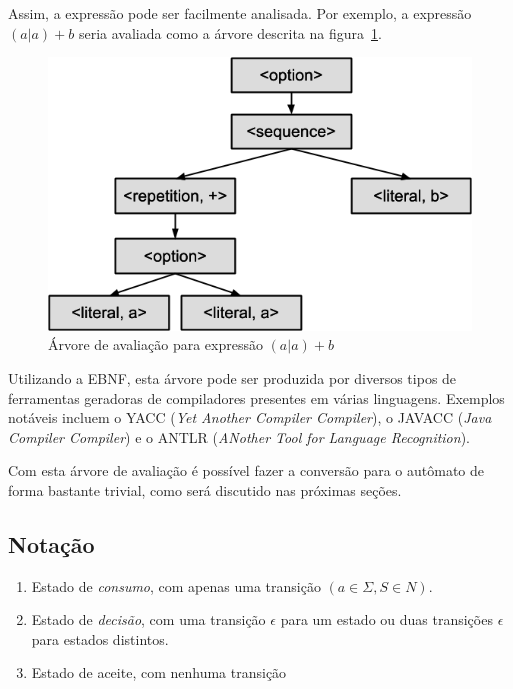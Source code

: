 \documentclass[a4paper,12pt,oneside,onecolumn]{uerj}
\begin{document}
Assim, a expressão pode ser facilmente analisada. Por exemplo, a expressão $(a|a)+b$ seria avaliada como a árvore descrita na figura~\ref{fig:aab_parse_tree}.

\begin{figure}[ht]
  \centering
  \includegraphics[scale=0.5]{figures/aab_parse_tree.png}
  \caption{Árvore de avaliação para expressão $(a|a)+b$}
  \label{fig:aab_parse_tree}
\end{figure}

Utilizando a EBNF, esta árvore pode ser produzida por diversos tipos de ferramentas geradoras de compiladores presentes em várias linguagens. Exemplos notáveis incluem o YACC (\emph{Yet Another Compiler Compiler}), o JAVACC (\emph{Java Compiler Compiler}) e o ANTLR (\emph{ANother Tool for Language Recognition}).

Com esta árvore de avaliação é possível fazer a conversão para o autômato de forma bastante trivial, como será discutido nas próximas seções.

\subsection{Notação}
\label{sec:Notacao}

\begin{enumerate}
    \item Estado de \emph{consumo},  com apenas uma transição $(a \in \Sigma, S \in N)$.
    \item Estado de \emph{decisão}, com uma transição $\epsilon$ para um estado ou duas transições $\epsilon$ para estados distintos.
    \item Estado de aceite, com nenhuma transição
\end{enumerate}
\end{document}
